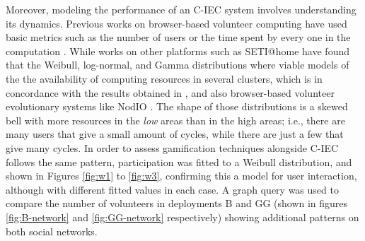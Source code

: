 Moreover, modeling the performance of an C-IEC system
involves understanding its dynamics. Previous works on browser-based
volunteer computing have used basic metrics such as
the number of users or the time spent by every one in the
computation \cite{DBLP:journals/gpem/LaredoBGVAGF14, 2016arXiv160101607M}. 
While works on other platforms such as SETI@home
\cite{javadi2009mining} have found that the Weibull, log-normal, and
Gamma distributions where viable models of the  
the availability of computing resources in several clusters, which  is 
in concordance with the results obtained in \cite{agajaj}, and also
browser-based volunteer evolutionary systems like NodIO \cite{DBLP:conf/gecco/MereloCGCRV16}.
The shape of those distributions is a skewed bell
with more resources in the {\em low} areas than in the high areas; i.e., 
there are many users that give a small amount of cycles, while there
are just a few that give many cycles. In order to assess gamification techniques alongside C-IEC follows the
same pattern, participation was fitted to a 
Weibull distribution,
and shown in Figures \ref{fig:w1} to \ref{fig:w3}, 
confirming this a model for user interaction, although with different fitted
values in each case. A graph query was used to compare the number of volunteers in deployments
B and GG (shown in figures \ref{fig:B-network} and \ref{fig:GG-network} respectively) showing 
additional patterns on both social networks. 

